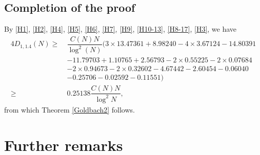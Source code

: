 \documentclass[12pt, a4paper]{amsart}
\def\ge{\geqslant}
\theoremstyle{plain}
\theoremstyle{remark}
\numberwithin{equation}{section}
\begin{document}
\subsection{Completion of the proof}
By \eqref{H1}, \eqref{H2}, \eqref{H4}, \eqref{H5}, \eqref{H6}, \eqref{H7}, \eqref{H9}, \eqref{H10-13}, 
\eqref{H8-17}, \eqref{H3}, we have
\begin{equation}
\begin{split}
4D_{1,1.4}(N)\ge\ & \dfrac{C(N)N}{\log^2(N)} 
(3\times 13.47361+8.98240-4\times 3.67124-14.80391\\
&-11.79703 +1.10765+2.56793-2\times 0.55225-2\times 0.07684\\
&-2\times 0.94673 -2\times 0.32602-4.67442-2.60454-0.06040\\ 
& -0.25706-0.02592-0.11551)\\ 
\ge\ & 0.25138\dfrac{C(N)N}{\log^2 N},
\end{split}
\end{equation}
from which Theorem \ref{Goldbach2} follows. 
	
\section{Further remarks}\label{sec8}
\end{document}
